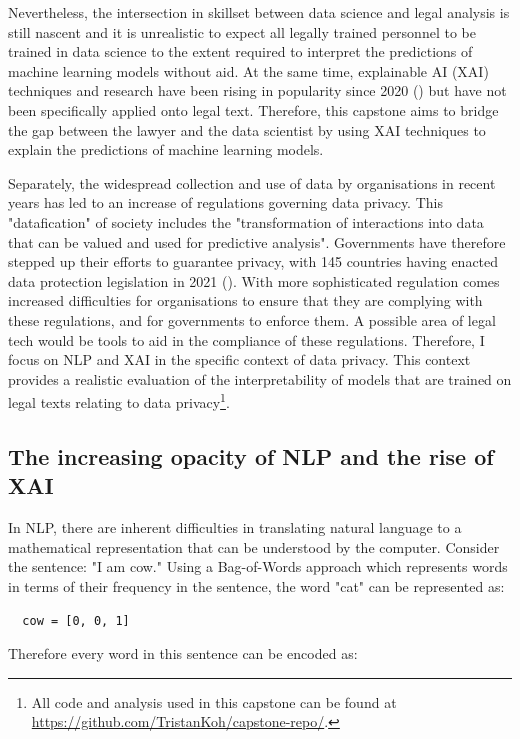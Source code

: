 Nevertheless, the intersection in skillset between data science and legal analysis is still nascent and it is unrealistic to expect all legally trained personnel to be trained in data science to the extent required to interpret the predictions of machine learning models without aid. At the same time, explainable AI (XAI) techniques and research have been rising in popularity since 2020 (\cite{linardatos2020}) but have not been specifically applied onto legal text. Therefore, this capstone aims to bridge the gap between the lawyer and the data scientist by using XAI techniques to explain the predictions of machine learning models. 

Separately, the widespread collection and use of data by organisations in recent years has led to an increase of regulations governing data privacy. This "datafication" of society includes the "transformation of interactions into data that can be valued and used for predictive analysis". Governments have therefore stepped up their efforts to guarantee privacy, with 145 countries having enacted data protection legislation in 2021 (\cite{gstrein2022}). With more sophisticated regulation comes increased difficulties for organisations to ensure that they are complying with these regulations, and for governments to enforce them. A possible area of legal tech would be tools to aid in the compliance of these regulations. Therefore, I focus on NLP and XAI in the specific context of data privacy. This context provides a realistic evaluation of the interpretability of models that are trained on legal texts relating to data privacy\footnote{All code and analysis used in this capstone can be found at \url{https://github.com/TristanKoh/capstone-repo/}.}.

\subsection{The increasing opacity of NLP and the rise of XAI}
In NLP, there are inherent difficulties in translating natural language to a mathematical representation that can be understood by the computer. Consider the sentence: "I am cow." Using a Bag-of-Words approach which represents words in terms of their frequency in the sentence, the word "cat" can be represented as:

\begin{lstlisting}
  cow = [0, 0, 1]
\end{lstlisting}

Therefore every word in this sentence can be encoded as: 

